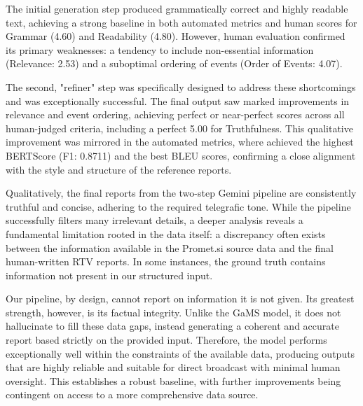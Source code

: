 \documentclass[fleqn,moreauthors,10pt]{ds_report}
\begin{document}
The initial generation step produced grammatically correct and highly readable text, achieving a strong baseline in both automated metrics and human scores for Grammar (4.60) and Readability (4.80). However, human evaluation confirmed its primary weaknesses: a tendency to include non-essential information (Relevance: 2.53) and a suboptimal ordering of events (Order of Events: 4.07).

The second, "refiner" step was specifically designed to address these shortcomings and was exceptionally successful. The final output saw marked improvements in relevance and event ordering, achieving perfect or near-perfect scores across all human-judged criteria, including a perfect 5.00 for Truthfulness. This qualitative improvement was mirrored in the automated metrics, where achieved the highest BERTScore (F1: 0.8711) and the best BLEU scores, confirming a close alignment with the style and structure of the reference reports.

Qualitatively, the final reports from the two-step Gemini pipeline are consistently truthful and concise, adhering to the required telegrafic tone. While the pipeline successfully filters many irrelevant details, a deeper analysis reveals a fundamental limitation rooted in the data itself: a discrepancy often exists between the information available in the Promet.si source data and the final human-written RTV reports. In some instances, the ground truth contains information not present in our structured input.

Our pipeline, by design, cannot report on information it is not given. Its greatest strength, however, is its factual integrity. Unlike the GaMS model, it does not hallucinate to fill these data gaps, instead generating a coherent and accurate report based strictly on the provided input. Therefore, the model performs exceptionally well within the constraints of the available data, producing outputs that are highly reliable and suitable for direct broadcast with minimal human oversight. This establishes a robust baseline, with further improvements being contingent on access to a more comprehensive data source.
\end{document}
